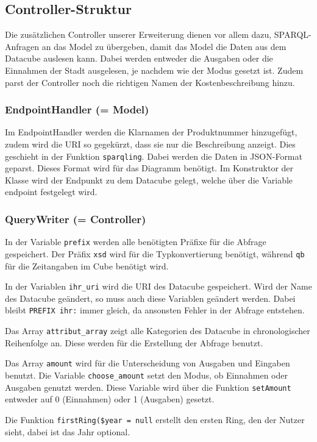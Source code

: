 \documentclass[a4paper,11pt,twoside]{article}
\begin{document}
\subsection{Controller-Struktur}

Die zusätzlichen Controller unserer Erweiterung dienen vor allem dazu,
SPARQL-Anfragen an das Model zu übergeben, damit das Model die Daten aus dem
Datacube auslesen kann. Dabei werden entweder die Ausgaben oder die Einnahmen
der Stadt ausgelesen, je nachdem wie der Modus gesetzt ist. Zudem parst der
Controller noch die richtigen Namen der Kostenbeschreibung hinzu.

\subsubsection{EndpointHandler (= Model)}
Im EndpointHandler werden die Klarnamen der Produktnummer hinzugefügt, zudem
wird die URI so gegekürzt, dass sie nur die Beschreibung anzeigt. Dies
geschieht in der Funktion \texttt{sparqling}. Dabei werden die Daten in
JSON-Format geparst. Dieses Format wird für das Diagramm benötigt. Im
Konstruktor der Klasse wird der Endpunkt zu dem Datacube gelegt, welche über
die Variable endpoint festgelegt wird.

\subsubsection{QueryWriter (= Controller)}
In der Variable \texttt{prefix} werden alle benötigten Präfixe für die Abfrage
gespeichert. Der Präfix \texttt{xsd} wird für die Typkonvertierung benötigt,
während \texttt{qb} für die Zeitangaben im Cube benötigt wird.

In der Variablen \texttt{ihr\_uri} wird die URI des Datacube gespeichert. Wird
der Name des Datacube geändert, so muss auch diese Variablen geändert
werden. Dabei bleibt \texttt{PREFIX ihr:} immer gleich, da ansonsten Fehler in
der Abfrage entstehen. 

Das Array \texttt{attribut\_array} zeigt alle Kategorien des Datacube in
chronologischer Reihenfolge an. Diese werden für die Erstellung der Abfrage
benutzt. 

Das Array \texttt{amount} wird für die Unterscheidung von Ausgaben und
Eingaben benutzt. Die Variable \texttt{choose\_amount} setzt den Modus, ob
Einnahmen oder Ausgaben genutzt werden. Diese Variable wird über die Funktion
\texttt{setAmount} entweder auf 0 (Einnahmen) oder 1 (Ausgaben) gesetzt.  

Die Funktion \texttt{firstRing(\$year = null} erstellt den ersten Ring, den
der Nutzer sieht, dabei ist das Jahr optional. 
\end{document}
